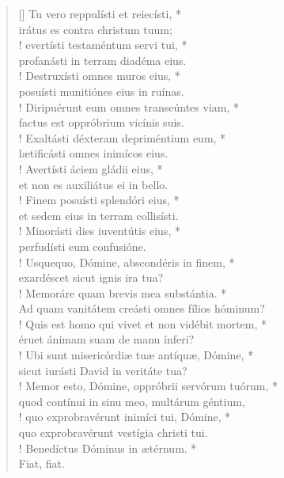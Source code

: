 \begin{verse}[\versewidth]
Tu vero reppulísti et reiecísti, *\\
irátus es contra christum tuum;\\!
\vin evertísti testaméntum servi tui, *\\
\vin profanásti in terram diadéma eius.\\!
Destruxísti omnes muros eius, *\\
posuísti munitiónes eius in ruínas.\\!
\vin Diripuérunt eum omnes transeúntes viam, *\\
\vin factus est oppróbrium vicínis suis.\\!
Exaltásti déxteram depriméntium eum, *\\
lætificásti omnes inimícos eius.\\!
\vin Avertísti áciem gládii eius, *\\
\vin et non es auxiliátus ei in bello.\\!
Finem posuísti splendóri eius, *\\
et sedem eius in terram collisísti.\\!
\vin Minorásti dies iuventútis eius, *\\
\vin perfudísti eum confusióne.\\!
Usquequo, Dómine, abscondéris in finem, *\\
exardéscet sicut ignis ira tua?\\!
\vin Memoráre quam brevis mea substántia. *\\
\vin Ad quam vanitátem creásti omnes fílios hóminum?\\!
Quis est homo qui vivet et non vidébit mortem, *\\
éruet ánimam suam de manu ínferi?\\!
\vin Ubi sunt misericórdiæ tuæ antíquæ, Dómine, *\\
\vin sicut iurásti David in veritáte tua?\\!
Memor esto, Dómine, oppróbrii servórum tuórum, *\\
quod contínui in sinu meo, multárum géntium,\\!
\vin quo exprobravérunt inimíci tui, Dómine, *\\
\vin quo exprobravérunt vestígia christi tui.\\!
Benedíctus Dóminus in ætérnum. *\\
Fiat, fiat.\\
\end{verse}
\vspace{1cm}


